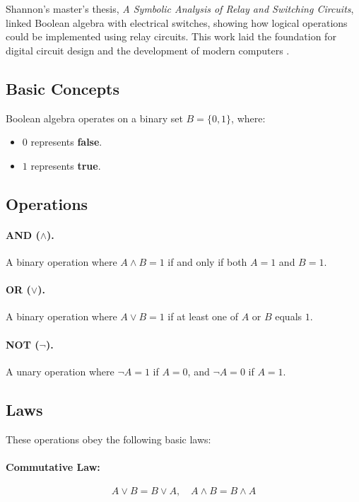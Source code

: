 Shannon's master's thesis, \emph{A Symbolic Analysis of Relay and Switching Circuits}, linked Boolean algebra with electrical switches, showing how logical operations could be implemented using relay circuits. This work laid the foundation for digital circuit design and the development of modern computers \cite{shannon38}.

\subsection{Basic Concepts}
Boolean algebra operates on a binary set \( B = \{0, 1\} \), where:
\begin{itemize}
    \item \( 0 \) represents \textbf{false}.
    \item \( 1 \) represents \textbf{true}.
\end{itemize}

\subsection{Operations}
\paragraph{AND (\( \land \)).} A binary operation where \( A \land B = 1 \) if and only if both \( A = 1 \) and \( B = 1 \).
\paragraph{ OR (\( \lor \)).}  A binary operation where \( A \lor B = 1 \) if at least one of \( A \) or \( B \) equals \( 1 \).

\paragraph{NOT (\( \neg \)).} A unary operation where \( \neg A = 1 \) if \( A = 0 \), and \( \neg A = 0 \) if \( A = 1 \).

\subsection{Laws}
These operations obey the following basic laws:
\paragraph{Commutative Law:} 
\[
A \lor B = B \lor A, \quad A \land B = B \land A
\]

